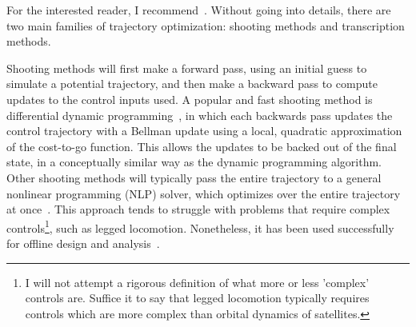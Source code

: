 For the interested reader, I recommend~\cite{kelly2017introduction}. Without going into details, there are two main families of trajectory optimization: shooting methods and transcription methods.
\par
Shooting methods will first make a forward pass, using an initial guess to simulate a potential trajectory, and then make a backward pass to compute updates to the control inputs used.
A popular and fast shooting method is differential dynamic programming~\cite{tassa2011theory}, in which each backwards pass updates the control trajectory with a Bellman update using a local, quadratic approximation of the cost-to-go function. This allows the updates to be backed out of the final state, in a conceptually similar way as the dynamic programming algorithm.
Other shooting methods will typically pass the entire trajectory to a general nonlinear programming (NLP) solver, which optimizes over the entire trajectory at once~\cite{kelly2017introduction}. This approach tends to struggle with problems that require complex controls\footnote{I will not attempt a rigorous definition of what more or less 'complex' controls are. Suffice it to say that legged locomotion typically requires controls which are more complex than orbital dynamics of satellites.}, such as legged locomotion. Nonetheless, it has been used successfully for offline design and analysis~\cite{mombaur_2009,remy2011matlab}. \par
